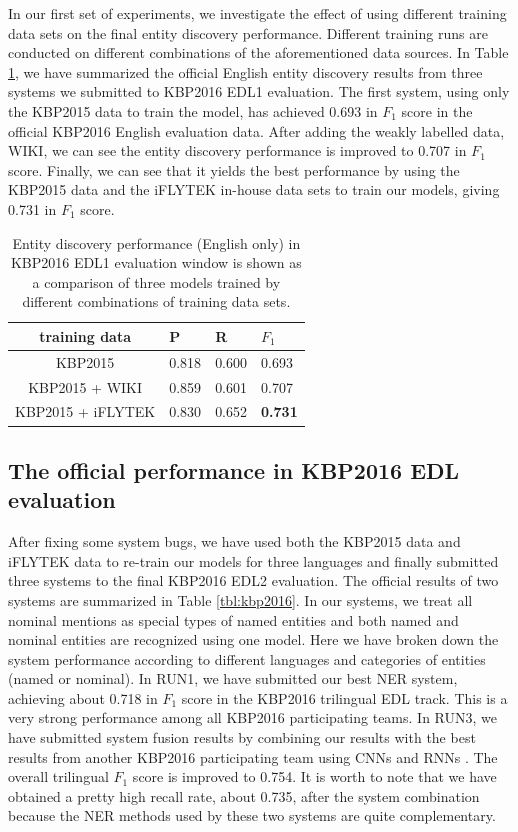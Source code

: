 \documentclass[11pt,a4paper]{article}
\begin{document}
In our first set of experiments, we investigate the effect of using different training data sets on the final entity discovery performance. 
Different training runs are conducted  on different combinations of the aforementioned data sources.
In Table \ref{tbl:kbp2016-EDL1}, we have summarized the official English entity discovery results from three systems we submitted to KBP2016 EDL1 evaluation. The first system, using only the KBP2015 data to train the model, has achieved 0.693 in $F_1$ score in the official KBP2016 English evaluation data. After adding the weakly labelled data, WIKI, we can see the entity discovery performance is improved to 0.707 in  $F_1$ score. Finally, we can see that it yields the best performance by using the KBP2015 data and the iFLYTEK in-house data sets to train our models, giving 0.731 in $F_1$ score.

\begin{table}[t]
	\centering
	\begin{tabular}{|c|ll|l|}
		\hline
		training data  &  P   &  R  &  $F_1$ \\ \hline \hline
		KBP2015 &  0.818 & 0.600 & 0.693 \\
		KBP2015 + WIKI  &   0.859 & 0.601 & 0.707 \\	
		KBP2015 + iFLYTEK &  0.830 & 0.652 & \bf 0.731 \\
		\hline
	\end{tabular}
	\caption{Entity discovery performance (English only) in KBP2016 EDL1 evaluation window is shown as a comparison of three models trained by different combinations of training data sets. }
	\label{tbl:kbp2016-EDL1}	
\end{table}


\subsection{The official performance in KBP2016 EDL evaluation}

After fixing some system bugs, we have used both the KBP2015 data and iFLYTEK data to re-train our models for three languages and finally submitted three systems to the final KBP2016 EDL2 evaluation. The official results of two systems are summarized in Table \ref{tbl:kbp2016}. In our systems, we treat all nominal mentions as special types of named entities and both named and nominal entities are recognized using one model. Here we have broken down the system performance according to different languages and categories of entities (named or nominal). In RUN1, we have submitted our best NER system, achieving about 0.718 in $F_1$ score in the KBP2016 trilingual EDL track. This  is a very strong performance among all KBP2016 participating teams. In RUN3, we have submitted system fusion results by combining our results with the best results from another KBP2016 participating team using CNNs and RNNs \cite{kbp2016iflytek}. The overall trilingual $F_1$ score is improved to 0.754.  It is worth to note that we have obtained a pretty high recall rate, about 0.735, after the system combination because the NER methods used by these two systems are quite complementary.  
\end{document}
